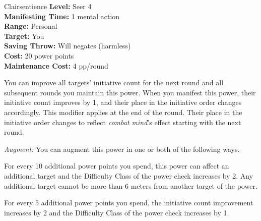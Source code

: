 {Clairsentience}
{
	\textbf{Level:}
	Seer 4\\
	\textbf{Manifesting Time:}
	1 mental action\\
	\textbf{Range:}
	Personal\\
	\textbf{Target:}
	You\\
	\textbf{Saving Throw:}
	Will negates (harmless)\\
	\textbf{Cost:}
	20 power points\\
	\textbf{Maintenance Cost:}
	4 pp/round\\
}
{
	You can improve all targets' initiative count for the next round and all subsequent rounds you maintain this power. When you manifest this power, their initiative count improves by 1, and their place in the initiative order changes accordingly. This modifier applies at the end of the round. Their place in the initiative order changes to reflect \emph{combat mind}'s effect starting with the next round.

	\textit{Augment:} You can augment this power in one or both of the following ways.
	\begin{enumerate*}
		\item For every 10 additional power points you spend, this power can affect an additional target and the Difficulty Class of the power check increases by 2. Any additional target cannot be more than 6 meters from another target of the power.
		\item For every 5 additional power points you spend, the initiative count improvement increases by 2 and the Difficulty Class of the power check increases by 1.
	\end{enumerate*}
}